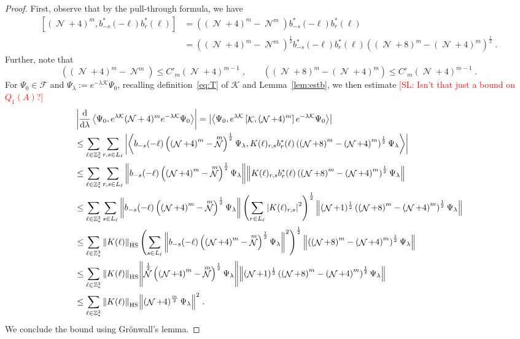 \documentclass[12pt,a4paper]{article}
\numberwithin{equation}{section}
\newcommand{\cF}{\mathcal{F}}
\newcommand{\cK}{\mathcal{K}}
\newcommand{\1}{\mathbb{I}}
\newcommand{\di}{\textnormal{d}}
\newcommand{\HS}{\mathrm{HS}}
\DeclareMathOperator{\KK}{\mathcal{K}}
\DeclareMathOperator{\NN}{\mathcal{N}}
\newcommand{\half}{\frac{1}{2}}
\newcommand{\eva}[1]{\left\langle #1 \right\rangle}
\theoremstyle{plain}
\theoremstyle{definition}
\theoremstyle{remark}
\theoremstyle{plain}
\theoremstyle{definition}
\theoremstyle{remark}
\begin{document}
\begin{proof}
First, observe that by the pull-through formula, we have
\begin{align}
	\left[(\NN+4)^m, b^*_{-s}(-\ell)b^*_{r}(\ell)\right] &= \left( (\NN+4)^m - \NN^m \right) b^*_{-s}(-\ell)b^*_{r}(\ell) \nonumber \\
	&= \left( \left(\NN+4\right)^m - \NN^m \right)^\half b^*_{-s}(-\ell)b^*_{r}(\ell) \left( \left(\NN+8\right)^m - \left(\NN+4\right)^m \right)^\half \;.
\end{align}
Further, note that
\begin{equation}
	\left( \left(\NN+4\right)^m - \NN^m \right)
	\leq C'_m \left(\NN+4\right)^{m-1} \;, \qquad
	\left( \left(\NN+8\right)^m - \left(\NN+4\right)^m \right)
	\leq  C'_m \left(\NN+4\right)^{m-1} \;.
\end{equation}
For $ \Psi_0 \in \cF $ and $ \Psi_\lambda := e^{-\lambda \cK} \Psi_0 $, recalling definition~\eqref{eq:T} of $ \cK $ and Lemma~\ref{lem:estb}, we then estimate \textcolor{red}{[SL: Isn't that just a bound on $ Q_1(A) $?]}
\begin{align}
	&\left|\frac{\di}{\di\lambda}\eva{\Psi_0, e^{\lambda \cK} (\mathcal{N}+4)^m e^{-\lambda \cK} \Psi_0 }\right|
	= \left| \eva{\Psi_0, e^{\lambda \cK} \left[\KK, (\NN+4)^m\right] e^{-\lambda \cK} \Psi_0}\right|\nonumber\\
	&\leq \sum\limits_{\ell\in \mathbb{Z}^3_*}\sum\limits_{r,s\in L_\ell} \abs{\eva{  b_{-s}(-\ell) \left( \left(\NN+4\right)^m - \NN^m \right)^\half \Psi_\lambda, K(\ell)_{r,s} b^*_{r}(\ell) \left( \left(\NN+8\right)^m - \left(\NN+4\right)^m \right)^\half \Psi_\lambda }}\nonumber\\
	&\leq \sum\limits_{\ell\in \mathbb{Z}^3_*}\sum\limits_{r,s\in L_\ell} \norm{ b_{-s}(-\ell) \left( \left(\NN+4\right)^m - \NN^m \right)^\half \Psi_\lambda} \norm {K(\ell)_{r,s} b^*_{r}(\ell) \left( \left(\NN+8\right)^m - \left(\NN+4\right)^m \right)^\half \Psi_\lambda} \nonumber\\
	&\leq \sum\limits_{\ell\in \mathbb{Z}^3_*}\sum\limits_{s\in L_\ell} \norm{  b_{-s}(-\ell) \left( \left(\NN+4\right)^m - \NN^m \right)^\half \Psi_\lambda} \left(\sum\limits_{r\in L_\ell} \abs{K(\ell)_{r,s}}^2 \right)^\half \norm { (\NN+1)^\half \left( \left(\NN+8\right)^m - \left(\NN+4\right)^m \right)^\half \Psi_\lambda} \nonumber\\
	&\leq \sum\limits_{\ell\in \mathbb{Z}^3_*} \norm{K(\ell)}_{\HS}\left(\sum\limits_{s\in L_\ell} \norm{  b_{-s}(-\ell) \left( \left(\NN+4\right)^m - \NN^m \right)^\half \Psi_\lambda}^2\right)^\half \norm{ \left( \left(\NN+8\right)^m - \left(\NN+4\right)^m \right)^\half \Psi_\lambda }\nonumber\\
	&\leq \sum\limits_{\ell\in \mathbb{Z}^3_*} \norm{K(\ell)}_{\HS}\norm{ \NN^\half \left( \left(\NN+4\right)^m - \NN^m \right)^\half \Psi_\lambda} \norm{ (\NN+1)^\half \left( \left(\NN+8\right)^m - \left(\NN+4\right)^m \right)^\half \Psi_\lambda }\nonumber\\
	&\leq \sum\limits_{\ell\in \mathbb{Z}^3_*} \norm{K(\ell)}_{\HS}\norm{ \left(\NN+4\right)^\frac{m}{2} \Psi_\lambda}^2 \;.
\end{align}
We conclude the bound using Gr\"onwall's lemma.
\end{proof}
\end{document}
